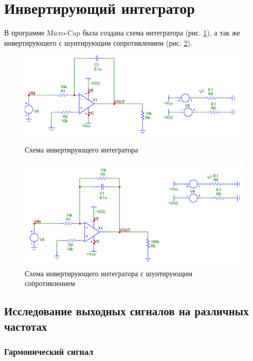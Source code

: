 \documentclass[a4paper,14pt]{article}
\begin{document}

\pagebreak
\section{Инвертирующий интегратор}

В программе Micro-Cap была создана схема интегратора (рис. \ref{fig:schema_int_base}), а так же инвертирующего с шунтирующим сопротивлением (рис. \ref{fig:schema_int}).

\begin{figure}[H]
	\centering
	\includegraphics[width=\linewidth]{../imgs/schema_int_base}
	\caption{Схема инвертирующего интегратора}
	\label{fig:schema_int_base}
\end{figure}

\begin{figure}[H]
	\centering
	\includegraphics[width=\linewidth]{../imgs/schema_int}
	\caption{Схема инвертирующего интегратора с шунтирующим сопротивлением}
	\label{fig:schema_int}
\end{figure}

\subsection{Исследование выходных сигналов на различных частотах}

\subsubsection{Гармонический сигнал}
\end{document}
